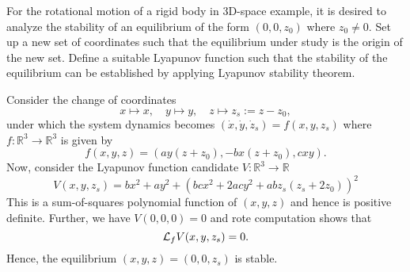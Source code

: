 \question[20]
%
For the rotational motion of a rigid body in $3$D-space example, it is desired
to analyze the stability of an equilibrium of the form $(0, 0, z_0)$ where $z_0
\neq 0$. Set up a new set of coordinates such that the equilibrium under study 
is the origin of the new set. Define a suitable Lyapunov function such that the 
stability of the equilibrium can be established by applying Lyapunov stability 
theorem.

\begin{solution}

Consider the change of coordinates \[ x \mapsto x, \quad y \mapsto y, \quad z
\mapsto z_s := z - z_0, \] under which the system dynamics becomes $(\dot{x},
\dot{y}, \dot{z}_s) = f(x,y,z_s)$ where $f: \mathbb{R}^3 \rightarrow
\mathbb{R}^3$ is given by 
\[ f(x,y,z) = \left(a y (z + z_0), -b x (z + z_0), c x y \right). \]
%
Now, consider the Lyapunov function candidate $V: \mathbb{R}^3 \rightarrow
\mathbb{R}$ \[ V(x,y,z_s) = bx^2 + ay^2 + \left( bcx^2 + 2acy^2 + abz_s(z_s +
2z_0) \right)^2  \] This is a sum-of-squares polynomial function of $(x,y,z)$
and hence is positive definite. Further, we have $V(0,0,0) = 0$ and rote
computation shows that \[ \mathcal{L}_fV(x,y,z_s) = 0. \]
Hence, the equilibrium $(x,y,z) = (0,0,z_s)$ is stable.


\end{solution}